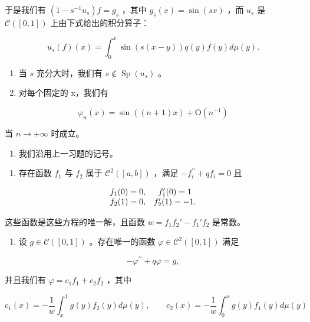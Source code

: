 于是我们有 \((1-s^{-1}u_{s})f=g_{s}\) ，其中 \(g_{s}(x)=\sin(sx)\) ，而 \(u_{s}\) 是 \(\mathcal{C}([0,1])\) 上由下式给出的积分算子：

\[
u _ {s} (f) (x) = \int_ {0} ^ {x} \sin (s (x - y)) q (y) f (y) d \mu (y).
\]

\begin{enumerate}
\def\labelenumi{\alph{enumi})}
\setcounter{enumi}{2}
\item
  当 \(s\) 充分大时，我们有 \(s \notin \operatorname{Sp}(u_s)\) 。
\item
  对每个固定的 x，我们有
\end{enumerate}

\[
\varphi_ {n} (x) = \sin ((n + 1) x) + \mathrm{O} (n ^ {- 1})
\]

当 \(n \rightarrow +\infty\) 时成立。

\begin{enumerate}
\def\labelenumi{\arabic{enumi})}
\setcounter{enumi}{21}
\tightlist
\item
  我们沿用上一习题的记号。
\end{enumerate}

\begin{enumerate}
\def\labelenumi{\alph{enumi})}
\tightlist
\item
  存在函数 \(f_{1}\) 与 \(f_{2}\) 属于 \(\mathcal{C}^{2}([a,b])\) ，满足 \(-f_{i}^{\prime\prime} + qf_{i} = 0\) 且
\end{enumerate}

\[
\begin{array}{c c} f _ {1} (0) = 0, & f _ {1} ^ {\prime} (0) = 1 \\ f _ {2} (1) = 0, & f _ {2} ^ {\prime} (1) = - 1. \end{array}
\]

这些函数是这些方程的唯一解，且函数 \(w = f_{1}f_{2}' - f_{1}'f_{2}\) 是常数。

\begin{enumerate}
\def\labelenumi{\alph{enumi})}
\setcounter{enumi}{1}
\tightlist
\item
  设 \(g \in \mathcal{C}([0,1])\) 。存在唯一的函数 \(\varphi \in \mathcal{C}^2([0,1])\) 满足
\end{enumerate}

\[
- \varphi^ {\prime \prime} + q \varphi = g,
\]

并且我们有 \(\varphi = c_{1}f_{1} + c_{2}f_{2}\) ，其中

\[
c _ {1} (x) = - \frac {1}{w} \int_ {x} ^ {1} g (y) f _ {2} (y) d \mu (y), \qquad c _ {2} (x) = - \frac {1}{w} \int_ {0} ^ {x} g (y) f _ {1} (y) d \mu (y)
\]

